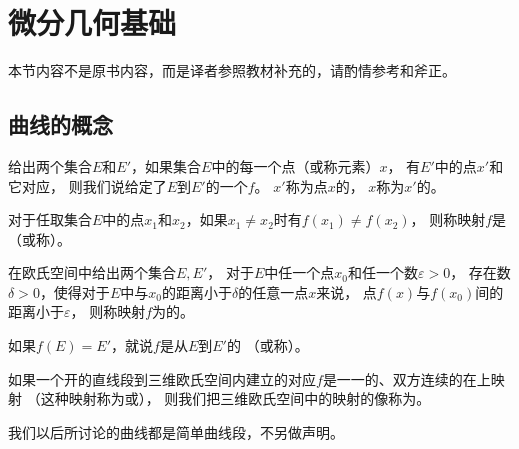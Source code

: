 \section{微分几何基础}\label{sec:微分几何基础}
\begin{remark}
    本节内容不是原书内容，而是译者参照教材补充的，请酌情参考和斧正。
\end{remark}

\subsection{曲线的概念}\label{sub:曲线的概念}
\begin{definition}
    给出两个集合$E$和$E'$，如果集合$E$中的每一个点（或称元素）$x$，
    有$E'$中的点$x'$和它对应，
    则我们说给定了$E$到$E'$的一个$f$。
    $x'$称为点$x$的，
    $x$称为$x'$的。
\end{definition}
\begin{definition}
    对于任取集合$E$中的点$x_1$和$x_2$，如果$x_1\neq x_2$时有$f(x_1)\neq f(x_2)$，
    则称映射$f$是（或称）。
\end{definition}
\begin{definition}
    在欧氏空间中给出两个集合$E,E'$，
    对于$E$中任一个点$x_0$和任一个数$\varepsilon>0$，
    存在数$\delta>0$，使得对于$E$中与$x_0$的距离小于$\delta$的任意一点$x$来说，
    点$f(x)$与$f(x_0)$间的距离小于$\varepsilon$，
    则称映射$f$为的。
\end{definition}
\begin{definition}
    如果$f(E)=E'$，就说$f$是从$E$到$E'$的
    （或称）。
\end{definition}
\begin{definition}
    如果一个开的直线段到三维欧氏空间内建立的对应$f$是一一的、双方连续的在上映射
    （这种映射称为或），
    则我们把三维欧氏空间中的映射的像称为。
\end{definition}

我们以后所讨论的曲线都是简单曲线段，不另做声明。

